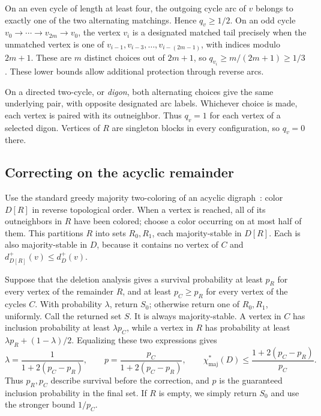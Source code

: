 \documentclass[12pt]{article}
\newcommand{\chif}{\chi^*_{\mathrm{maj}}}
\begin{document}
On an even cycle of length at least four, the outgoing cycle arc of \(v\) belongs to exactly one of the two alternating matchings. Hence \(q_v\ge1/2\). On an odd cycle \(v_0\to\cdots\to v_{2m}\to v_0\), the vertex \(v_i\) is a designated matched tail precisely when the unmatched vertex is one of \(v_{i-1},v_{i-3},\ldots,v_{i-(2m-1)}\), with indices modulo \(2m+1\). These are \(m\) distinct choices out of \(2m+1\), so \(q_{v_i}\ge m/(2m+1)\ge1/3\). These lower bounds allow additional protection through reverse arcs.

On a directed two-cycle, or \emph{digon}, both alternating choices give the same underlying pair, with opposite designated arc labels. Whichever choice is made, each vertex is paired with its outneighbor. Thus \(q_v=1\) for each vertex of a selected digon. Vertices of \(R\) are singleton blocks in every configuration, so \(q_v=0\) there.

\subsection{Correcting on the acyclic remainder}
Use the standard greedy majority two-coloring of an acyclic digraph~\cite{KOSZW}: color \(D[R]\) in reverse topological order. When a vertex is reached, all of its outneighbors in \(R\) have been colored; choose a color occurring on at most half of them. This partitions \(R\) into sets \(R_0,R_1\), each majority-stable in \(D[R]\). Each is also majority-stable in \(D\), because it contains no vertex of \(C\) and \(d_{D[R]}^+(v)\le d_D^+(v)\).

Suppose that the deletion analysis gives a survival probability at least \(p_R\) for every vertex of the remainder \(R\), and at least \(p_C\ge p_R\) for every vertex of the cycles \(C\). With probability \(\lambda\), return \(S_0\); otherwise return one of \(R_0,R_1\), uniformly. Call the returned set \(S\). It is always majority-stable. A vertex in \(C\) has inclusion probability at least \(\lambda p_C\), while a vertex in \(R\) has probability at least \(\lambda p_R+(1-\lambda)/2\). Equalizing these two expressions gives
\begin{equation}\label{eq:mixture}
\lambda=\frac{1}{1+2(p_C-p_R)},\qquad
p=\frac{p_C}{1+2(p_C-p_R)},\qquad
\chif(D)\le\frac{1+2(p_C-p_R)}{p_C}.
\end{equation}
Thus \(p_R,p_C\) describe survival before the correction, and \(p\) is the guaranteed inclusion probability in the final set. If \(R\) is empty, we simply return \(S_0\) and use the stronger bound \(1/p_C\).
\end{document}
